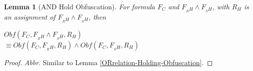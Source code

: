 \documentclass[conference,compsocconf]{IEEEtran}
\newtheorem{lemma}{\textbf{Lemma}}
\begin{document}
\begin{lemma}[AND Hold Obfuscation]\label{ANDrelation-Holding-Obfuscation}
For formula $F_C$ and $F_{_RH}\wedge F_{_SH}$, 
with $R_H$ is an assignment of $F_{_RH} \wedge F_{_SH}$, then

$Obf(F_C,F_{_RH} \wedge F_{_SH},R_H) $ \\
$\equiv Obf(F_C,F_{_RH},R_H) \wedge Obf(F_C,F_{_SH} ,R_H)$
\end{lemma}
\begin{proof} 
\textsl{Abbr.}
Similar to Lemma \ref{ORrelation-Holding-Obfuscation}.
% 
% 
\end{proof}
\end{document}
